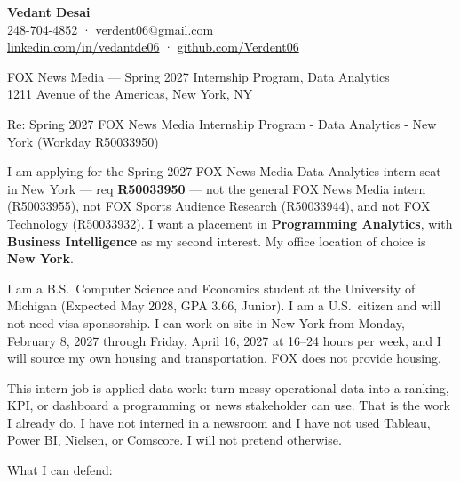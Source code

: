 \documentclass[11pt]{article}
\begin{document}
\noindent\textbf{Vedant Desai}\\
248-704-4852 · \href{mailto:verdent06@gmail.com}{verdent06@gmail.com}\\
\href{https://linkedin.com/in/vedantde06}{linkedin.com/in/vedantde06} · \href{https://github.com/Verdent06}{github.com/Verdent06}

\vspace{0.6em}
\noindent FOX News Media --- Spring 2027 Internship Program, Data Analytics\\
1211 Avenue of the Americas, New York, NY

\vspace{0.4em}
\noindent Re: Spring 2027 FOX News Media Internship Program - Data Analytics - New York (Workday R50033950)

I am applying for the Spring 2027 FOX News Media Data Analytics intern seat in New York --- req \textbf{R50033950} --- not the general FOX News Media intern (R50033955), not FOX Sports Audience Research (R50033944), and not FOX Technology (R50033932). I want a placement in \textbf{Programming Analytics}, with \textbf{Business Intelligence} as my second interest. My office location of choice is \textbf{New York}.

I am a B.S.\ Computer Science and Economics student at the University of Michigan (Expected May 2028, GPA 3.66, Junior). I am a U.S.\ citizen and will not need visa sponsorship. I can work on-site in New York from Monday, February 8, 2027 through Friday, April 16, 2027 at 16--24 hours per week, and I will source my own housing and transportation. FOX does not provide housing.

This intern job is applied data work: turn messy operational data into a ranking, KPI, or dashboard a programming or news stakeholder can use. That is the work I already do. I have not interned in a newsroom and I have not used Tableau, Power BI, Nielsen, or Comscore. I will not pretend otherwise.

What I can defend:
\end{document}
